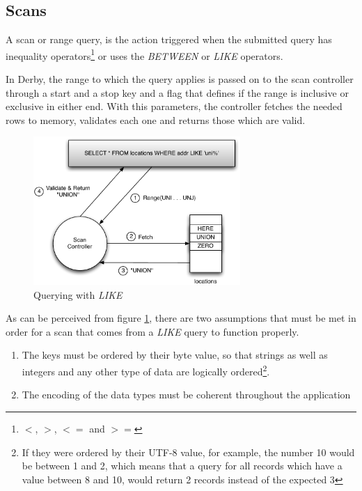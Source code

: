 \subsection{Scans}
\label{sec:derby_scans}

A scan or range query, is the action triggered when the submitted query has inequality operators\footnote{$<$, $>$, $<=$ and $>=$} or uses the \emph{BETWEEN} or \emph{LIKE} operators.

In Derby, the range to which the query applies is passed on to the scan controller through a start and a stop key and a flag that defines if the range is inclusive or exclusive in either end. With this parameters, the controller fetches the needed rows to memory, validates each one and returns those which are valid.

\begin{figure}[!h]
  \centering    
  \includegraphics[width=0.7\textwidth]{images/likescan}
  \caption{Querying with \emph{LIKE}}
  \label{fig:likescan}
\end{figure}

As can be perceived from figure \ref{fig:likescan}, there are two assumptions that must be met in order for a scan that comes from a \emph{LIKE} query to function properly.

\begin{enumerate}
	\item The keys must be ordered by their byte value, so that strings as well as integers and any other type of data are logically ordered\footnote{If they were ordered by their UTF-8 value, for example, the number 10 would be between 1 and 2, which means that a query for all records which have a value between 8 and 10, would return 2 records instead of the expected 3}.
	\item The encoding of the data types must be coherent throughout the application 
\end{enumerate}

